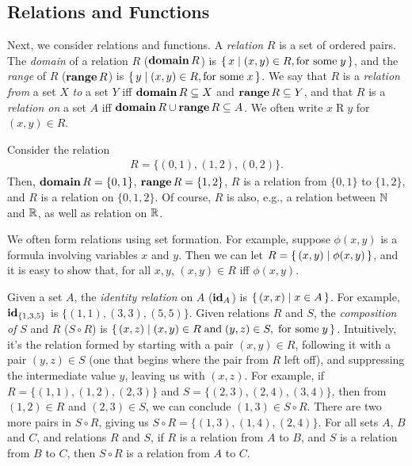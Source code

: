 \subsection{Relations and Functions}

Next, we consider relations and functions.  A \emph{relation}
%
$R$ is a set of ordered pairs.  The \emph{domain}
%
%
of a relation $R$ ($\mathbf{domain}\,R$)
%
%
is $\{ \, x \mid (x,y)\in R, \allowbreak\mbox{for
some}\allowbreak\;y \, \}$, and the \emph{range}
%
%
of $R$ ($\mathbf{range}\,R$)
%
%
is $\{ \, y \mid (x,y)\in R,
\allowbreak\mbox{for some}\allowbreak\;x \, \}$.  We say that $R$ is a \emph{relation from} a
%
set $X$ \emph{to} a set $Y$ iff $\mathbf{domain}\,R\subseteq X$ and $\mathbf{range}\,R\subseteq Y$,
and that $R$ is a \emph{relation on} a set $A$ iff
$\mathbf{domain}\,R\cup\mathbf{range}\,R\subseteq A$.  We often write $x\mathrel{R}y$ for
$(x, y)\in R$.

Consider the relation
\begin{gather*}
R=\{(0,1),(1,2),(0,2)\} .
\end{gather*}
Then, $\mathbf{domain}\,R=\{0,1\}$, $\mathbf{range}\,R=\{1,2\}$, $R$ is a relation from
$\{0,1\}$ to $\{1,2\}$, and $R$ is a relation on $\{0,1,2\}$.
Of course, $R$ is also, e.g., a relation between $\mathbb{N}$ and $\mathbb{R}$,
as well as relation on $\mathbb{R}$.

We often form relations using set formation.
%
%
%
%
For example, suppose
$\phi(x,y)$ is a formula involving variables $x$ and $y$.  Then we can
let $R=\{ \, (x,y) \mid \phi(x,y) \, \}$, and it is easy to show that, for all
$x, y$, $(x,y)\in R$ iff $\phi(x,y)$.

Given a set $A$, the \emph{identity relation}
%
%
on $A$ ($\mathbf{id}_A$)
%
%
is $\{ \, (x,x) \mid x\in A \, \}$.  For example, $\mathbf{id}_{\{1,3,5\}}$ is
$\{(1,1),(3,3),(5,5)\}$.
Given relations $R$ and $S$, the
\emph{composition of}
%
%
%
$S$ and $R$ ($S\circ R$)
%
%
is $\{ \, (x,z) \mid (x,y)\in R\;\allowbreak\mbox{and}\allowbreak\; (y,z)\in S,\;\allowbreak\mbox{for some}\allowbreak\; y \, \}$.
Intuitively, it's the relation formed by starting with a pair
$(x,y)\in R$, following it with a pair $(y,z)\in S$ (one that begins
where the pair from $R$ left off), and suppressing the intermediate
value $y$, leaving us with $(x,z)$.  For example, if $R=\{(1, 1), (1,
2), (2, 3)\}$ and $S=\{(2, 3), (2, 4), (3, 4)\}$, then from
$(1,2)\in R$ and $(2,3)\in S$, we can conclude $(1,3)\in S\circ R$.
There are two more pairs in $S\circ R$, giving us
$S\circ R=\{(1, 3), (1, 4), (2, 4)\}$.  For all sets $A$, $B$ and $C$,
and relations $R$ and $S$, if $R$ is a relation from $A$ to $B$,
and $S$ is a relation from $B$ to $C$, then $S\circ R$ is a relation
from $A$ to $C$.

